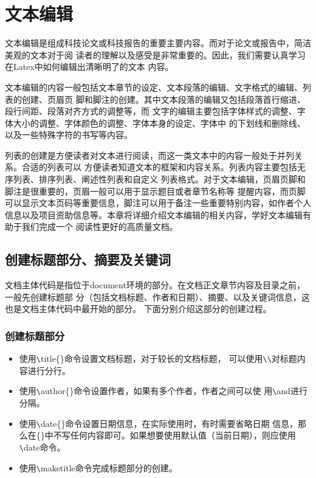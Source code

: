 \chapter{文本编辑}
文本编辑是组成科技论文或科技报告的重要主要内容。而对于论文或报告中，简洁美观的文本对于阅
读者的理解以及感受是非常重要的。因此，我们需要认真学习在Latex中如何编辑出清晰明了的文本
内容。

文本编辑的内容一般包括文本章节的设定、文本段落的编辑、文字格式的编辑、列表的创建、页眉页
脚和脚注的创建。其中文本段落的编辑又包括段落首行缩进、段行间距、段落对齐方式的调整等，而
文字的编辑主要包括字体样式的调整、字体大小的调整、字体颜色的调整、字体本身的设定、字体中
的下划线和删除线、以及一些特殊字符的书写等内容。

列表的创建是方便读者对文本进行阅读，而这一类文本中的内容一般处于并列关系。合适的列表可以
方便读者知道文本的框架和内容关系。列表内容主要包括无序列表、排序列表、阐述性列表和自定义
列表格式。对于文本编辑，页眉页脚和脚注是很重要的，页眉一般可以用于显示题目或者章节名称等
提醒内容，而页脚可以显示文本页码等重要信息，脚注可以用于备注一些重要特别内容，如作者个人
信息以及项目资助信息等。本章将详细介绍文本编辑的相关内容，学好文本编辑有助于我们完成一个
阅读性更好的高质量文档。

\section{创建标题部分、摘要及关键词}
文档主体代码是指位于document环境的部分。在文档正文章节内容及目录之前，一般先创建标题部
分（包括文档标题、作者和日期）、摘要、以及关键词信息，这也是文档主体代码中最开始的部分。
下面分别介绍这部分的创建过程。

\subsection{创建标题部分}
\begin{itemize}
      \item 使用\verb|\|title\{\}命令设置文档标题，对于较长的文档标题，
            可以使用\verb|\\|对标题内容进行分行。
      \item 使用\verb|\|author\{\}命令设置作者，如果有多个作者，作者之间可以使
            用\verb|\|and进行分隔。
      \item 使用\verb|\|date\{\}命令设置日期信息，在实际使用时，有时需要省略日期
            信息，那么在\{\}中不写任何内容即可。如果想要使用默认值（当前日期），则应使用\verb|\|date命令。
      \item 使用\verb|\|maketitle命令完成标题部分的创建。
\end{itemize}


